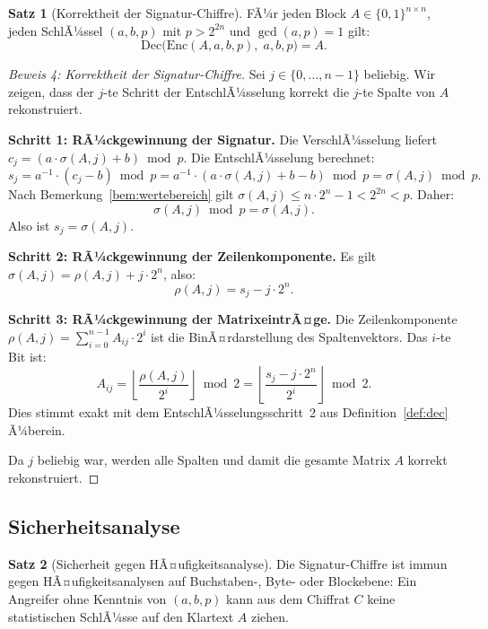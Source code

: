 ﻿\documentclass[a4paper,12pt]{scrreprt}
\theoremstyle{definition}
\newtheorem{satz}{Satz}[section]
\begin{document}
\begin{satz}[Korrektheit der Signatur-Chiffre]
	\label{satz:korrektheit}
	FÃ¼r jeden Block $A \in \{0,1\}^{n \times n}$, jeden SchlÃ¼ssel $(a,b,p)$ mit $p > 2^{2n}$ und $\gcd(a,p)=1$ gilt:
	\[
	\mathrm{Dec}\bigl(\mathrm{Enc}(A, a, b, p),\; a, b, p\bigr) = A.
	\]
\end{satz}

\begin{proof}[Beweis 4: Korrektheit der Signatur-Chiffre]
	Sei $j \in \{0,\ldots,n-1\}$ beliebig. Wir zeigen, dass der $j$-te Schritt der EntschlÃ¼sselung korrekt die $j$-te Spalte von $A$ rekonstruiert.
	
	\textbf{Schritt 1: RÃ¼ckgewinnung der Signatur.}
	Die VerschlÃ¼sselung liefert $c_j = (a \cdot \sigma(A,j) + b) \bmod p$. Die EntschlÃ¼sselung berechnet:
	\[
	s_j = a^{-1} \cdot (c_j - b) \bmod p = a^{-1} \cdot (a \cdot \sigma(A,j) + b - b) \bmod p = \sigma(A,j) \bmod p.
	\]
	Nach Bemerkung~\ref{bem:wertebereich} gilt $\sigma(A,j) \leq n \cdot 2^n - 1 < 2^{2n} < p$. Daher:
	\[
	\sigma(A,j) \bmod p = \sigma(A,j).
	\]
	Also ist $s_j = \sigma(A,j)$.
	
	\textbf{Schritt 2: RÃ¼ckgewinnung der Zeilenkomponente.}
	Es gilt $\sigma(A,j) = \rho(A,j) + j \cdot 2^n$, also:
	\[
	\rho(A,j) = s_j - j \cdot 2^n.
	\]
	
	\textbf{Schritt 3: RÃ¼ckgewinnung der MatrixeintrÃ¤ge.}
	Die Zeilenkomponente $\rho(A,j) = \sum_{i=0}^{n-1} A_{ij} \cdot 2^i$ ist die BinÃ¤rdarstellung des Spaltenvektors. Das $i$-te Bit ist:
	\[
	A_{ij} = \left\lfloor \frac{\rho(A,j)}{2^i} \right\rfloor \bmod 2 = \left\lfloor \frac{s_j - j \cdot 2^n}{2^i} \right\rfloor \bmod 2.
	\]
	Dies stimmt exakt mit dem EntschlÃ¼sselungsschritt~2 aus Definition~\ref{def:dec} Ã¼berein.
	
	Da $j$ beliebig war, werden alle Spalten und damit die gesamte Matrix $A$ korrekt rekonstruiert.
\end{proof}

\subsection{Sicherheitsanalyse}

\begin{satz}[Sicherheit gegen HÃ¤ufigkeitsanalyse]
	\label{satz:haeufigkeit}
	Die Signatur-Chiffre ist immun gegen HÃ¤ufigkeitsanalysen auf Buchstaben-, Byte- oder Blockebene: Ein Angreifer ohne Kenntnis von $(a, b, p)$ kann aus dem Chiffrat $C$ keine statistischen SchlÃ¼sse auf den Klartext $A$ ziehen.
\end{satz}
\end{document}
